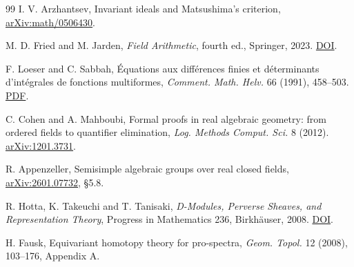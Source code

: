 \documentclass[11pt]{article}
\begin{document}
\begin{thebibliography}{99}
I. V. Arzhantsev, Invariant ideals and Matsushima's criterion,
\href{https://arxiv.org/abs/math/0506430}{arXiv:math/0506430}.

M. D. Fried and M. Jarden, \emph{Field Arithmetic}, fourth ed.,
Springer, 2023. \href{https://doi.org/10.1007/978-3-031-28020-7}{DOI}.

F. Loeser and C. Sabbah, \'Equations aux diff\'erences finies et
d\'eterminants d'int\'egrales de fonctions multiformes,
\emph{Comment. Math. Helv.} 66 (1991), 458--503.
\href{https://perso.pages.math.cnrs.fr/users/claude.sabbah/articles/loeser-sabbah91.pdf}{PDF}.

C. Cohen and A. Mahboubi, Formal proofs in real algebraic geometry:
from ordered fields to quantifier elimination,
\emph{Log. Methods Comput. Sci.} 8 (2012).
\href{https://arxiv.org/abs/1201.3731}{arXiv:1201.3731}.

R. Appenzeller, Semisimple algebraic groups over real closed fields,
\href{https://arxiv.org/abs/2601.07732}{arXiv:2601.07732}, \S5.8.

R. Hotta, K. Takeuchi and T. Tanisaki,
\emph{D-Modules, Perverse Sheaves, and Representation Theory},
Progress in Mathematics 236, Birkh\"auser, 2008.
\href{https://doi.org/10.1007/978-0-8176-4523-6}{DOI}.

H. Fausk, Equivariant homotopy theory for pro-spectra,
\emph{Geom. Topol.} 12 (2008), 103--176, Appendix A.
\end{thebibliography}
\end{document}
